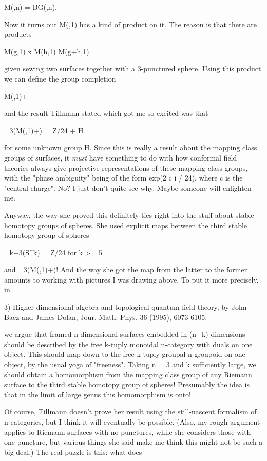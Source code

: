 M(\infty ,n) = BG(\infty ,n).  

Now it turns out M(\infty ,1) has a kind of product on it.  
The reason is that there are products

M(g,1) x M(h,1) \to  M(g+h,1)

given sewing two surfaces together with a 3-punctured sphere.
Using this product we can define the group completion 

M(\infty ,1)+

and the result Tillmann stated which got me so excited was
that 

\pi _{3}(M(\infty ,1)+) = Z/24 + H

for some unknown group H.  Since this is really a result about the
mapping class groups of surfaces, it \emph{must} have something to do with
how conformal field theories always give projective representations of
these mapping class groups, with the "phase ambiguity" being
of the form exp(2 \pi  c i / 24), where c is the "central charge".  
No?  I just don't quite see why.  Maybe someone
will enlighten me.

Anyway, the way she proved this definitely ties right into the stuff
about stable homotopy groups of spheres.  She used explicit maps between
the third stable homotopy group of spheres

\pi _{k+3}(S^{k}) = Z/24       for k >= 5

and \pi _{3}(M(\infty ,1)+)!  And the way she got the map from the latter
to the former amounts to working with pictures I was drawing above.  
To put it more precisely, in

3) Higher-dimensional algebra and topological quantum field theory, by
John Baez and James Dolan, Jour. Math. Phys. 36 (1995), 6073-6105.

we argue that framed n-dimensional surfaces embedded in
(n+k)-dimensions should be described by the free k-tuply monoidal
n-category with duals on one object.  This should map down to the free
k-tuply groupal n-groupoid on one object, by the usual yoga of
"freeness".  Taking n = 3 and k sufficiently large, we
should obtain a homomorphism from the mapping class group of any
Riemann surface to the third stable homotopy group of spheres!
Presumably the idea is that in the limit of large genus this
homomorphism is onto!

Of course, Tillmann doesn't prove her result using the still-nascent
formalism of n-categories, but I think it will eventually be possible.
(Also, my rough argument applies to Riemann surfaces with no punctures,
while she considers those with one puncture, but various things she said
make me think this might not be such a big deal.)  The real puzzle is
this: what does

